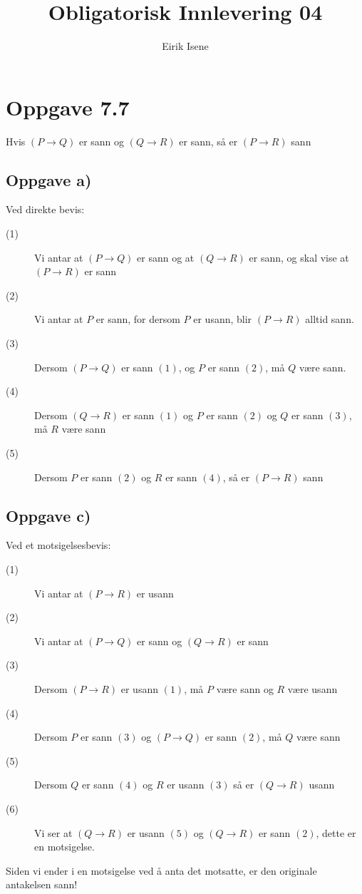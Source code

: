 \documentclass[norsk, 12p]{article}
\title{Obligatorisk Innlevering 04}
\author{Eirik Isene}
\begin{document}
\maketitle

\section{Oppgave 7.7}
Hvis $(P \to Q)$ er sann og $(Q \to R)$ er sann, så er $(P \to R)$ sann

\subsection{Oppgave a)}
Ved direkte bevis:
\begin{description}
\item[(1)] Vi antar at $(P \to Q)$ er sann og at $(Q \to R)$ er sann, og skal vise at $(P \to R)$ er sann
\item[(2)] Vi antar at $P$ er sann, for dersom $P$ er usann, blir $(P \to R)$ alltid sann.
\item[(3)] Dersom $(P \to Q)$ er sann $(1)$, og $P$ er sann $(2)$, må $Q$ være sann.
\item[(4)] Dersom $(Q \to R)$ er sann $(1)$ og $P$ er sann $(2)$ og $Q$ er sann $(3)$, må $R$ være sann
\item[(5)] Dersom $P$ er sann $(2)$ og $R$ er sann $(4)$, så er $(P \to R)$ sann
\end{description}

\subsection{Oppgave c)}
Ved et motsigelsesbevis:
\begin{description}
\item[(1)] Vi antar at $(P \to R)$ er usann
\item[(2)] Vi antar at $(P \to Q)$ er sann og $(Q \to R)$ er sann
\item[(3)] Dersom $(P \to R)$ er usann $(1)$, må $P$ være sann og $R$ være usann
\item[(4)] Dersom $P$ er sann $(3)$ og $(P \to Q)$ er sann $(2)$, må $Q$ være sann
\item[(5)] Dersom $Q$ er sann $(4)$ og $R$ er usann $(3)$ så er $(Q \to R)$ usann
\item[(6)] Vi ser at $(Q \to R)$ er usann $(5)$ og $(Q \to R)$ er sann $(2)$, dette er en motsigelse.   
\end{description}
Siden vi ender i en motsigelse ved å anta det motsatte, er den originale antakelsen sann!
\end{document}
